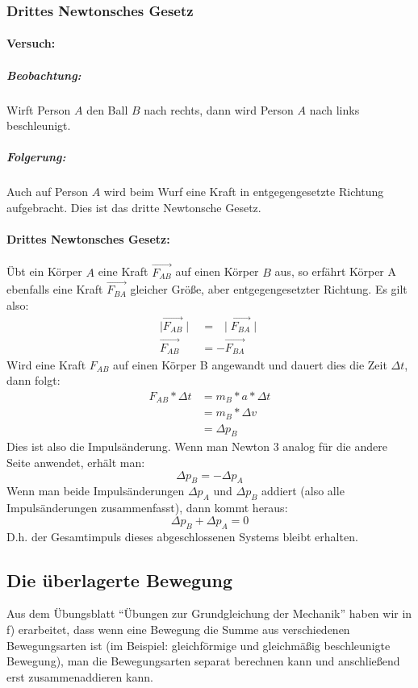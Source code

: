 	\subsubsection{Drittes Newtonsches Gesetz}
	\paragraph{Versuch:}
	\subparagraph{Beobachtung:}
	Wirft Person $ A $ den Ball $ B $ nach rechts, dann wird Person $ A $ nach links beschleunigt.
	\subparagraph{Folgerung:}
	Auch auf Person $ A $ wird beim Wurf eine Kraft in entgegengesetzte Richtung aufgebracht. Dies ist das dritte Newtonsche Gesetz.
	\paragraph{Drittes Newtonsches Gesetz:}
	Übt ein Körper $ A $ eine Kraft $ \vec{F_{AB}} $ auf einen Körper $ B $ aus, so erfährt Körper A ebenfalls eine Kraft $ \vec{F_{BA}} $ gleicher Größe, aber entgegengesetzter Richtung. Es gilt also:
	\begin{align}
		\mid\vec{F_{AB}}\mid &= \ \ \mid\vec{F_{BA}}\mid\\
		\vec{F_{AB}} &= -\vec{F_{BA}}
	\end{align}
	Wird eine Kraft $ F_{AB} $ auf einen Körper B angewandt und dauert dies die Zeit $ \Delta t $, dann folgt:
	\begin{align}
		F_{AB}*\Delta t &= m_B*a*\Delta t\\
		&= m_B*\Delta v\\
		&= \Delta p_B
	\end{align}
	Dies ist also die Impulsänderung. Wenn man Newton 3 analog für die andere Seite anwendet, erhält man:
	\begin{equation}
		\Delta p_B = -\Delta p_A
	\end{equation}
	Wenn man beide Impulsänderungen $ \Delta p_A $ und $ \Delta p_B $ addiert (also alle Impulsänderungen zusammenfasst), dann kommt heraus:
	\begin{equation}
		\Delta p_B+\Delta p_A = 0
	\end{equation}
	D.h. der Gesamtimpuls dieses abgeschlossenen Systems bleibt erhalten.
	
	\subsection{Die überlagerte Bewegung}
	Aus dem Übungsblatt ``Übungen zur Grundgleichung der Mechanik'' haben wir in f) erarbeitet, dass wenn eine Bewegung die Summe aus verschiedenen Bewegungsarten ist (im Beispiel: gleichförmige und gleichmäßig beschleunigte Bewegung), man die Bewegungsarten separat berechnen kann und anschließend erst zusammenaddieren kann.
